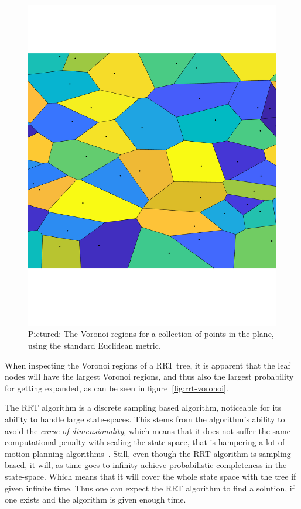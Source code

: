 \begin{figure}
  \centering \includegraphics[scale=.3]{figures/rrt/voronoi-diagram}
  \caption{Pictured: The Voronoi regions for a collection of points in the
    plane, using the standard Euclidean metric.}
  \label{fig:voronoi-diagram}
\end{figure}

When inspecting the Voronoi regions of a \ac{RRT} tree, it is apparent that the
leaf nodes will have the largest Voronoi regions, and thus also the largest
probability for getting expanded, as can be seen in
figure~\cref{fig:rrt-voronoi}.

The \ac{RRT} algorithm is a discrete sampling based algorithm, noticeable for
its ability to handle large state-spaces. This stems from the algorithm's
ability to avoid the \textit{curse of dimensionality}, which means that it does
not suffer the same computational penalty with scaling the state space, that is
hampering a lot of motion planning algorithms~\cite{Lav06}. Still, even though
the \ac{RRT} algorithm is sampling based, it will, as time goes to infinity
achieve probabilistic completeness in the state-space. Which means that it will
cover the whole state space with the tree if given infinite time. Thus one can
expect the \ac{RRT} algorithm to find a solution, if one exists and the
algorithm is given enough time.

